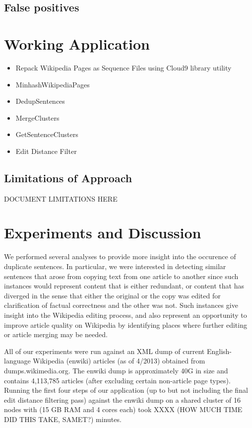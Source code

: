 \documentclass{acm_proc_article-sp}
\begin{document}
\subsection{False positives}

\begin{figure}
\centering
{}
\caption{}
\label{ed-grid}
\end{figure}

\section{Working Application}
\begin{itemize}
\item Repack Wikipedia Pages as Sequence Files using Cloud9 library utility
\item MinhashWikipediaPages
\item DedupSentences
\item MergeClusters
\item GetSentenceClusters
\item Edit Distance Filter
\end{itemize}

\subsection{Limitations of Approach}

DOCUMENT LIMITATIONS HERE

\section{Experiments and Discussion}

We performed several analyses to provide more insight into the occurence of duplicate sentences. In particular, we were interested in detecting similar sentences that arose from copying text from one article to another since such instances would represent content that is either redundant, or content that has diverged in the sense that either the original or the copy was edited for clarification of factual correctness and the other was not. Such instances give insight into the Wikipedia editing process, and also represent an opportunity to improve article quality on Wikipedia by identifying places where further editing or article merging may be needed.

All of our experiments were run against an XML dump of current English-language Wikipedia (enwiki) articles (as of 4/2013) obtained from dumps.wikimedia.org. The enwiki dump is approximately 40G in size and contains 4,113,785 articles (after excluding certain non-article page types). Running the first four steps of our application (up to but not including the final edit distance filtering pass) against the enwiki dump on a shared cluster of 16 nodes with (15 GB RAM and 4 cores each) took XXXX (HOW MUCH TIME DID THIS TAKE, SAMET?) minutes.
\end{document}
